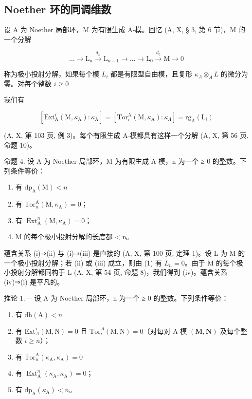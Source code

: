 \subsection{Noether 环的同调维数}

设 A 为 Noether 局部环，M 为有限生成 A-模。回忆 (A, X, § 3, 第 6 节)，M 的一个分解

\[
\dots \longrightarrow \mathrm{L} _ {n} \stackrel {d _ {n}} {\longrightarrow} \mathrm{L} _ {n - 1} \longrightarrow \dots \longrightarrow \mathrm{L} _ {0} \stackrel {d _ {0}} {\longrightarrow} \mathrm{M} \rightarrow 0
\]

称为极小投射分解，如果每个模 \(L_{i}\) 都是有限型自由模，且复形 \(\kappa_{A} \otimes_{A} L\) 的微分为零。对每个整数 \(i \geqslant 0\)

我们有

\[
[ \mathrm{Ext} _ {\mathrm{A}} ^ {i} (\mathrm{M}, \kappa_ {\mathrm{A}}): \kappa_ {\mathrm{A}} ] = [ \mathrm{Tor} _ {i} ^ {\mathrm{A}} (\mathrm{M}, \kappa_ {\mathrm{A}}): \kappa_ {\Lambda} ] = \mathrm{rg} _ {\mathrm{A}} (\mathrm{L} _ {i})\tag{1}
\]

(A, X, 第 103 页, 例 3)。每个有限生成 A-模都具有这样一个分解 (A, X, 第 56 页, 命题 10)。

命题 4. 设 A 为 Noether 局部环，M 为有限生成 A-模，n 为一个 ≥ 0 的整数。下列条件等价：

\begin{enumerate}
\def\labelenumi{(\roman{enumi})}
\item
  有 \(\mathrm{dp}_{\mathrm{A}}(\mathrm{M}) < n\)
\item
  有 \(\mathrm{Tor}_n^{\mathrm{A}}(\mathrm{M},\kappa_{\mathrm{A}}) = 0\)；
\item
  有 \(\operatorname{Ext}_{\mathrm{A}}^{n}(\mathrm{M},\kappa_{\mathrm{A}}) = 0\)；
\item
  M 的每个极小投射分解的长度都 \textless{} n。
\end{enumerate}

蕴含关系 (i)⇒(ii) 与 (i)⇒(iii) 是直接的 (A, X, 第 100 页, 定理 1)。设 L 为 M 的一个极小投射分解；若 (ii) 或 (iii) 成立，则由 (1) 有 \(L_{n}=0\)。由于 M 的每个极小投射分解都同构于 L (A, X, 第 54 页, 命题 8)，我们得到 (iv)。蕴含关系 (iv)⇒(i) 是平凡的。

推论 1.--- 设 A 为 Noether 局部环，n 为一个 ≥ 0 的整数。下列条件等价：

\begin{enumerate}
\def\labelenumi{(\roman{enumi})}
\item
  有 \(\mathrm{dh}(\mathrm{A}) < n\)
\item
  有 \(\mathrm{Ext}_{A}^{i}(\mathrm{M},\mathrm{N}) = 0\) 且 \(\mathrm{Tor}_i^A (\mathrm{M},\mathrm{N}) = 0\)（对每对 A-模 \((\mathbf{M},\mathbf{N})\) 及每个整数 \(i\geqslant n\)）；
\item
  有 \(\mathrm{Tor}_n^{\mathrm{A}}(\kappa_{\mathrm{A}},\kappa_{\mathrm{A}}) = 0\)
\item
  有 \(\operatorname{Ext}_{\mathrm{A}}^{n}(\kappa_{\mathrm{A}},\kappa_{\mathrm{A}}) = 0\)；
\item
  有 \(\mathrm{dp}_{\mathrm{A}}(\kappa_{\mathrm{A}}) < n\)。
\end{enumerate}

